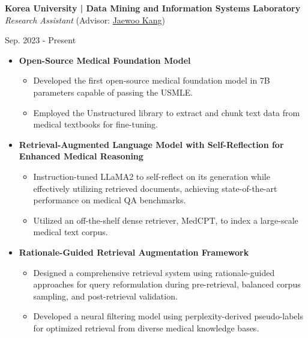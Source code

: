 \documentclass[10pt, letterpaper]{article}
\newenvironment{highlights}{
    \begin{itemize}[
        topsep=0.10 cm,
        parsep=0.10 cm,
        partopsep=0pt,
        itemsep=0pt,
        leftmargin=0 cm + 10pt
    ]
}{
    \end{itemize}
} %
\newenvironment{twocolentry}[2][]{
    \onecolentry
    \def\secondColumn{#2}
    \setcolumnwidth{\fill, 3.5 cm}
    \begin{paracol}{2}
}{
    \switchcolumn \raggedleft \secondColumn
    \end{paracol}
    \endonecolentry
} %
\begin{document}
\vspace{0.15 cm}      
\begin{twocolentry}{
            Sep. 2023 - Present\\ 
}
\textbf{Korea University | Data Mining and Information Systems Laboratory} \href{https://dmis.korea.ac.kr/home}{\faExternalLink*}\\
\textit{Research Assistant} (Advisor: \href{https://scholar.google.co.kr/citations?user=RaBZafQAAAAJ&hl=ko}{Jaewoo Kang})
        \end{twocolentry}
\vspace{0.1 cm}
\begin{highlights}
    \item \textbf{Open-Source Medical Foundation Model}
    \vspace{-0.1 cm}
    \begin{highlights}
        \item Developed the first open-source medical foundation model in 7B parameters capable of passing the USMLE.
    \item Employed the Unstructured library to extract and chunk text data from medical textbooks for fine-tuning.
\end{highlights}
    \item \textbf{Retrieval-Augmented Language Model with Self-Reflection for Enhanced Medical Reasoning}
\vspace{-0.1 cm}
    \begin{highlights}
\item Instruction-tuned LLaMA2 to self-reflect on its generation while effectively utilizing retrieved documents, achieving state-of-the-art performance on medical QA benchmarks.
\item Utilized an off-the-shelf dense retriever, MedCPT, to index a large-scale medical text corpus.
    \end{highlights}

    \item \textbf{Rationale-Guided Retrieval Augmentation Framework}
    \vspace{-0.1 cm}
\begin{highlights}
    \item Designed a comprehensive retrieval system using rationale-guided approaches for query reformulation during pre-retrieval, balanced corpus sampling, and post-retrieval validation.
    \item Developed a neural filtering model using perplexity-derived pseudo-labels for optimized retrieval from diverse medical knowledge bases.
\end{highlights}
\end{highlights}
\end{document}
